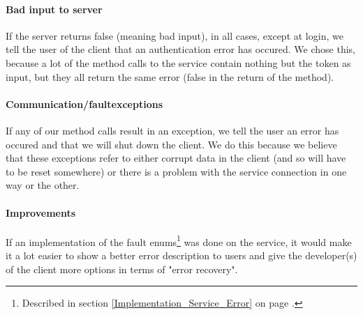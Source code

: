 \paragraph{Bad input to server} If the server returns false (meaning bad input), in all cases, except at login, we tell the user of the client that an authentication error has occured. We chose this, because a lot of the method calls to the service contain nothing but the token as input, but they all return the same error (false in the return of the method).

\paragraph{Communication/faultexceptions} If any of our method calls result in an exception, we tell the user an error has occured and that we will shut down the client. We do this because we believe that these exceptions refer to either corrupt data in the client (and so will have to be reset somewhere) or there is a problem with the service connection in one way or the other.

\paragraph{Improvements} If an implementation of the fault enums\footnote{Described in section \ref{Implementation_Service_Error} on page \pageref{Implementation_Service_Error}.} was done on the service, it would make it a lot easier to show a better error description to users and give the developer(s) of the client more options in terms of "error recovery".